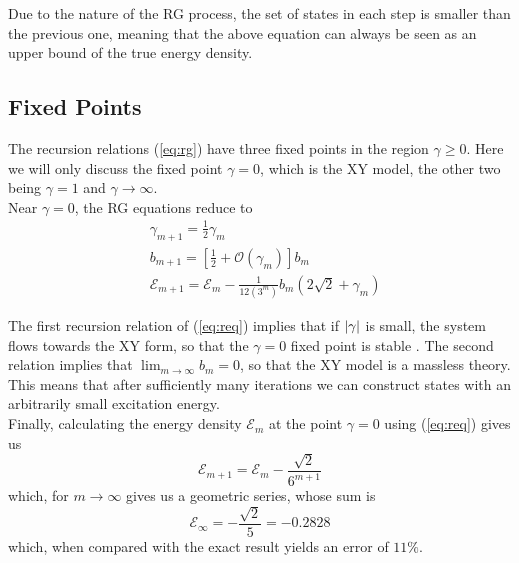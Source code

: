 \documentclass[../rsrg.tex,../../main.tex]{subfiles}
\begin{document}
Due to the nature of the RG process, the set of states in each step is smaller than the previous one, meaning that the above equation can always be seen as an upper bound of the true energy density.\\
\subsection{Fixed Points}
The recursion relations (\ref{eq:rg}) have three fixed points in the region $\gamma \ge 0$. Here we will only discuss the fixed point $\gamma = 0$, which is the XY model, the other two being $\gamma =1$ and $\gamma \to\infty$\cite{rabin}.\\

Near $\gamma=0$, the RG equations reduce to 
\begin{equation}
\begin{aligned}
&\gamma_{m+1}=\frac{1}{2} \gamma_{m} \\
&b_{m+1}=\left[\frac{1}{2}+\mathcal{O}\left(\gamma_{m}\right)\right] b_{m} \\
&\mathcal{E}_{m+1}=\mathcal{E}_{m}-\frac{1}{12\left(3^{m}\right)} b_{m}\left(2 \sqrt{2}+\gamma_{m}\right)
\end{aligned}
\label{eq:req}
\end{equation}

The first recursion relation of (\ref{eq:req}) implies that if $\abs{\gamma}$ is small, the system flows towards the XY form, so that the $\gamma=0$ fixed point is stable . The second relation implies that $\lim_{m\to\infty}b_{m}=0$, so that the XY model is a massless theory. This means that after sufficiently many iterations we can construct states with an arbitrarily small excitation energy.\\

Finally, calculating the energy density $\mathcal{E}_{m}$ at the point $\gamma=0$ using (\ref{eq:req}) gives us
\begin{equation}
    \mathcal{E}_{m+1}=\mathcal{E}_{m}-\frac{\sqrt{2}}{6^{m+1}}
\end{equation}
which, for $m\to\infty$ gives us a geometric series, whose sum is
\begin{equation}
    \mathcal{E}_{\infty}=-\frac{\sqrt{2}}{5}=-0.2828
\end{equation}
which, when compared with the exact result\cite{lieb} yields an error of $11\%$.
\end{document}
